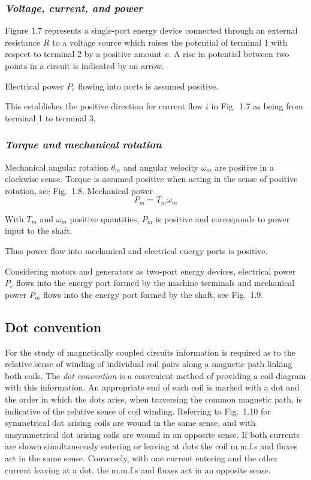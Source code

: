 \documentclass[a4paper,numbers=noenddot,12pt]{scrbook}
\begin{document}
        \subsubsection{\textit{Voltage, current, and power}} Figure 1.7 represents a single-port energy device connected through an external resistance $R$ to a voltage source which raises the potential of terminal 1 with respect to terminal 2 by a positive amount $v$. A rise in potential between two points in a circuit is indicated by an arrow.

        Electrical power $P_e$ flowing into ports is assumed positive.

        This establishes the positive direction for current flow $i$ in Fig.\ 1.7 as being from terminal 1 to terminal 3.

        \subsubsection{\textit{Torque and mechanical rotation}} Mechanical angular rotation $\theta_m$ and angular velocity $\omega_m$ are positive in a clockwise sense. Torque is assumed positive when acting in the sense of positive rotation, see Fig.\ 1.8.
        Mechanical power
        \begin{equation*}
            P_m = T_m \omega_m
        \end{equation*}

        With $T_m$ and $\omega_m$ positive quantities, $P_m$ is positive and corresponds to power input to the shaft.

        Thus power flow into mechanical and electrical energy ports is positive.

        Considering motors and generators as two-port energy devices, electrical power $P_e$ flows into the energy port formed by the machine terminals and mechanical power $P_m$ flows into the energy port formed by the shaft, see Fig.\ 1.9.

        \subsection{Dot convention}
        For the study of magnetically coupled circuits information is required as to the relative sense of winding of individual coil pairs along a magnetic path linking both coils. The \textit{dot convention} is a convenient method of providing a coil diagram with this information. An appropriate end of each coil is marked with a dot and the order in which the dots arise, when traversing the common magnetic path, is indicative of the relative sense of coil winding. Referring to Fig.\ 1.10 for symmetrical dot arising
        coils are wound in the same sense, and with unsymmetrical dot arising
        coils are wound in an opposite sense. If both currents are shown simultaneously entering or leaving at dots the coil m.m.f.s and fluxes act in the same sense. Conversely, with one current entering and the other current leaving at a dot, the m.m.f.s and fluxes act in an opposite sense.
\end{document}
